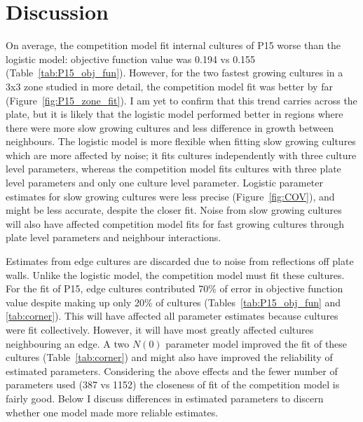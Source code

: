 \graphicspath{{images/}}

\section{Discussion}
\label{sec:discussion}


On average, the competition model fit internal cultures of P15 worse
than the logistic model: objective function value was 0.194 vs 0.155
(Table~\ref{tab:P15_obj_fun}). However, for the two fastest growing
cultures in a 3x3 zone studied in more detail, the competition model
fit was better by far (Figure~\ref{fig:P15_zone_fit}). I am yet to
confirm that this trend carries across the plate, but it is likely
that the logistic model performed better in regions where there were
more slow growing cultures and less difference in growth between
neighbours. The logistic model is more flexible when fitting slow
growing cultures which are more affected by noise; it fits cultures
independently with three culture level parameters, whereas the
competition model fits cultures with three plate level parameters and
only one culture level parameter. Logistic parameter estimates for
slow growing cultures were less precise (Figure~\ref{fig:COV}), and might be less accurate,
despite the closer fit. Noise from slow growing cultures will also
have affected competition model fits for fast growing cultures through
plate level parameters and neighbour interactions.

Estimates from edge cultures are discarded due to noise from
reflections off plate walls. Unlike the logistic model, the
competition model must fit these cultures. For the fit of P15, edge
cultures contributed 70\% of error in objective function value despite
making up only 20\% of cultures (Tables~\ref{tab:P15_obj_fun} and
\ref{tab:corner}). This will have affected all parameter estimates
because cultures were fit collectively. However, it will have most
greatly affected cultures neighbouring an edge. A two \(N(0)\)
parameter model improved the fit of these cultures
(Table~\ref{tab:corner}) and might also have improved the reliability
of estimated parameters.
Considering the above effects and the fewer number of parameters used
(387 vs 1152) the closeness of fit of the competition model is fairly
good. Below I discuss differences in estimated parameters to discern
whether one model made more reliable estimates.

